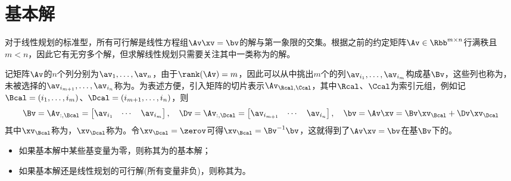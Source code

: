 \documentclass{ctexart}
\begin{document}
\section{基本解}

对于线性规划的标准型，所有可行解是线性方程组$\Av \xv = \bv$的解与第一象限的交集。根据之前的约定矩阵$\Av \in \Rbb^{m \times n}$行满秩且$m < n$，因此它有无穷多个解，但求解线性规划只需要关注其中一类称为的解。

记矩阵$\Av$的$n$个列分别为$\av_1, \ldots, \av_n$，由于$\rank(\Av) = m$，因此可以从中挑出$m$个的列$\av_{i_1}, \ldots, \av_{i_m}$构成基$\Bv$，这些列也称为，未被选择的$\av_{i_{m+1}}, \ldots, \av_{i_n}$称为。为表述方便，引入矩阵的切片表示$\Av_{\Rcal,\Ccal}$，其中$\Rcal$、$\Ccal$为索引元组，例如记$\Bcal = (i_1, \ldots, i_m)$、$\Dcal = (i_{m+1}, \ldots, i_n)$，则
\begin{align*}
    \Bv = \Av_{:,\Bcal} =
    \begin{bmatrix}
        \av_{i_1} & \cdots & \av_{i_m}
    \end{bmatrix}, \quad
    \Dv = \Av_{:,\Dcal} =
    \begin{bmatrix}
        \av_{i_{m+1}} & \cdots & \av_{i_n}
    \end{bmatrix}, \quad \bv = \Av \xv = \Bv \xv_\Bcal + \Dv \xv_\Dcal
\end{align*}
其中$\xv_\Bcal$称为，$\xv_\Dcal$称为。令$\xv_\Dcal = \zerov$可得$\xv_\Bcal = \Bv^{-1} \bv$，这就得到了$\Av \xv = \bv$在基$\Bv$下的。
\begin{itemize}
    \item 如果基本解中某些基变量为零，则称其为的基本解；
    \item 如果基本解还是线性规划的可行解(所有变量非负)，则称其为。
\end{itemize}
\end{document}
